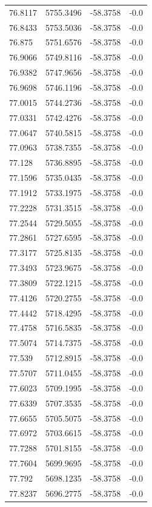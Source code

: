 \begin{table}[H]
\begin{tabular}{llll}
76.8117 & 5755.3496 & -58.3758 & -0.0 \\
76.8433 & 5753.5036 & -58.3758 & -0.0 \\
76.875 & 5751.6576 & -58.3758 & -0.0 \\
76.9066 & 5749.8116 & -58.3758 & -0.0 \\
76.9382 & 5747.9656 & -58.3758 & -0.0 \\
76.9698 & 5746.1196 & -58.3758 & -0.0 \\
77.0015 & 5744.2736 & -58.3758 & -0.0 \\
77.0331 & 5742.4276 & -58.3758 & -0.0 \\
77.0647 & 5740.5815 & -58.3758 & -0.0 \\
77.0963 & 5738.7355 & -58.3758 & -0.0 \\
77.128 & 5736.8895 & -58.3758 & -0.0 \\
77.1596 & 5735.0435 & -58.3758 & -0.0 \\
77.1912 & 5733.1975 & -58.3758 & -0.0 \\
77.2228 & 5731.3515 & -58.3758 & -0.0 \\
77.2544 & 5729.5055 & -58.3758 & -0.0 \\
77.2861 & 5727.6595 & -58.3758 & -0.0 \\
77.3177 & 5725.8135 & -58.3758 & -0.0 \\
77.3493 & 5723.9675 & -58.3758 & -0.0 \\
77.3809 & 5722.1215 & -58.3758 & -0.0 \\
77.4126 & 5720.2755 & -58.3758 & -0.0 \\
77.4442 & 5718.4295 & -58.3758 & -0.0 \\
77.4758 & 5716.5835 & -58.3758 & -0.0 \\
77.5074 & 5714.7375 & -58.3758 & -0.0 \\
77.539 & 5712.8915 & -58.3758 & -0.0 \\
77.5707 & 5711.0455 & -58.3758 & -0.0 \\
77.6023 & 5709.1995 & -58.3758 & -0.0 \\
77.6339 & 5707.3535 & -58.3758 & -0.0 \\
77.6655 & 5705.5075 & -58.3758 & -0.0 \\
77.6972 & 5703.6615 & -58.3758 & -0.0 \\
77.7288 & 5701.8155 & -58.3758 & -0.0 \\
77.7604 & 5699.9695 & -58.3758 & -0.0 \\
77.792 & 5698.1235 & -58.3758 & -0.0 \\
77.8237 & 5696.2775 & -58.3758 & -0.0 \\

\end{tabular}
\end{table}
